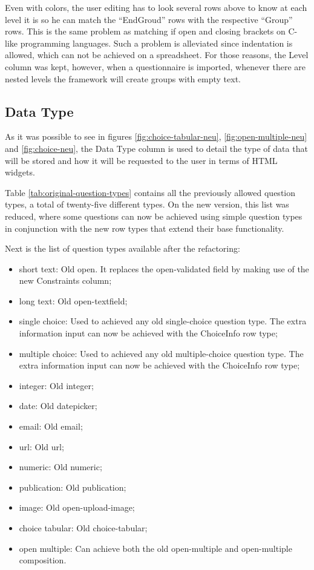 Even with colors, the user editing has to look several rows above to know at each level it is so he can match the ``EndGroud'' rows with the respective ``Group'' rows.
This is the same problem as matching if open and closing brackets on C-like programming languages.
Such a problem is alleviated since indentation is allowed, which can not be achieved on a spreadsheet.
For those reasons, the Level column was kept, however, when a questionnaire is imported, whenever there are nested levels the framework will create groups with empty text.

\subsection*{Data Type}

As it was possible to see in figures \ref{fig:choice-tabular-neu}, \ref{fig:open-multiple-neu} and \ref{fig:choice-neu}, the Data Type column is used to detail the type of data that will be stored and how it will be requested to the user in terms of HTML widgets.

Table \ref{tab:original-question-types} contains all the previously allowed question types, a total of twenty-five different types.
On the new version, this list was reduced, where some questions can now be achieved using simple question types in conjunction with the new row types that extend their base functionality.

Next is the list of question types available after the refactoring:

\begin{itemize}
    \item short text: Old open. It replaces the open-validated field by making use of the new Constraints column;
    \item long text: Old open-textfield;
    \item single choice: Used to achieved any old single-choice question type. The extra information input can now be achieved with the ChoiceInfo row type;
    \item multiple choice: Used to achieved any old multiple-choice question type. The extra information input can now be achieved with the ChoiceInfo row type;
    \item integer: Old integer;
    \item date: Old datepicker;
    \item email: Old email;
    \item url: Old url;
    \item numeric: Old numeric;
    \item publication: Old publication;
    \item image: Old open-upload-image;
    \item choice tabular: Old choice-tabular;
    \item open multiple: Can achieve both the old open-multiple and open-multiple composition.
\end{itemize}

